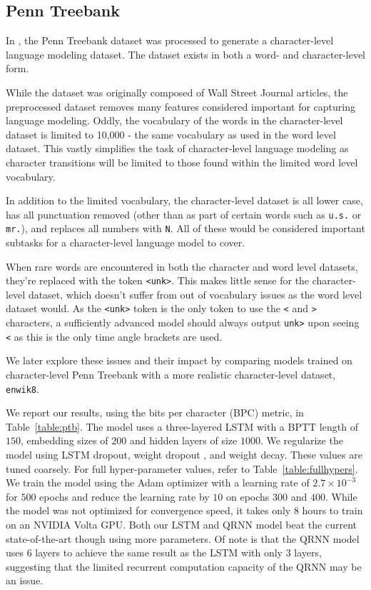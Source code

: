 \documentclass{article}
\newcommand{\enwik}{\texttt{enwik8}\xspace}
\begin{document}
\subsection{Penn Treebank}

In \citet{Mikolov2010}, the Penn Treebank dataset \citep{marcus1994penn} was processed to generate a character-level language modeling dataset.
The dataset exists in both a word- and character-level form.

While the dataset was originally composed of Wall Street Journal articles, the preprocessed dataset removes many features considered important for capturing language modeling.
Oddly, the vocabulary of the words in the character-level dataset is limited to 10,000 - the same vocabulary as used in the word level dataset.
This vastly simplifies the task of character-level language modeling as character transitions will be limited to those found within the limited word level vocabulary.

In addition to the limited vocabulary, the character-level dataset is all lower case, has all punctuation removed (other than as part of certain words such as \verb+u.s.+ or \verb+mr.+), and replaces all numbers with \verb+N+.
All of these would be considered important subtasks for a character-level language model to cover.

When rare words are encountered in both the character and word level datasets, they're replaced with the token \verb+<unk>+.
This makes little sense for the character-level dataset, which doesn't suffer from out of vocabulary issues as the word level dataset would.
As the \verb+<unk>+ token is the only token to use the \verb+<+ and \verb+>+ characters, a sufficiently advanced model should always output \verb+unk>+ upon seeing \verb+<+ as this is the only time angle brackets are used.

We later explore these issues and their impact by comparing models trained on character-level Penn Treebank with a more realistic character-level dataset, \enwik.

We report our results, using the bits per character (BPC) metric, in Table~\ref{table:ptb}.
The model uses a three-layered LSTM with a BPTT length of $150$, embedding sizes of $200$ and hidden layers of size $1000$.
We regularize the model using LSTM dropout, weight dropout \cite{merity2018regularizing}, and weight decay.
These values are tuned coarsely.
For full hyper-parameter values, refer to Table~\ref{table:fullhypers}.
We train the model using the Adam \cite{kingma2014adam} optimizer with a learning rate of $2.7 \times 10^{-3}$ for $500$ epochs and reduce the learning rate by $10$ on epochs $300$ and $400$.
While the model was not optimized for convergence speed, it takes only 8 hours to train on an NVIDIA Volta GPU.
Both our LSTM and QRNN model beat the current state-of-the-art though using more parameters.
Of note is that the QRNN model uses 6 layers to achieve the same result as the LSTM with only 3 layers, suggesting that the limited recurrent computation capacity of the QRNN may be an issue.
\end{document}
